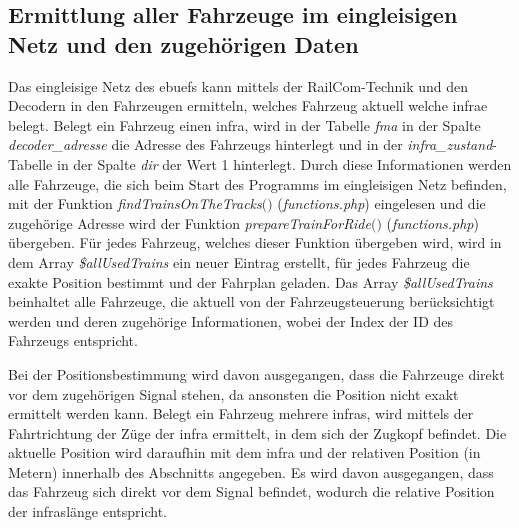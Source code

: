 \subsection{Ermittlung aller Fahrzeuge im eingleisigen Netz und den zugehörigen Daten} \label{main_2}
Das eingleisige Netz des \acp{ebuef} kann mittels der RailCom-Technik und den Decodern in den Fahrzeugen ermitteln, welches Fahrzeug aktuell welche \ac{infra}e belegt. Belegt ein Fahrzeug einen \ac{infra}, wird in der Tabelle \textit{fma} in der Spalte \textit{decoder\_adresse} die Adresse des Fahrzeugs hinterlegt und in der \textit{infra\_zustand}-Tabelle in der Spalte \textit{dir} der Wert 1 hinterlegt. Durch diese Informationen werden alle Fahrzeuge, die sich beim Start des Programms im eingleisigen Netz befinden, mit der Funktion \textit{find\-Trains\-On\-The\-Tracks$($$)$} (\textit{functions.php}) eingelesen und die zugehörige Adresse wird der Funktion \textit{prepare\-Train\-For\-Ride$($$)$} (\textit{functions.php}) übergeben. Für jedes Fahrzeug, welches dieser Funktion übergeben wird, wird in dem Array \textit{\$allUsedTrains} ein neuer Eintrag erstellt, für jedes Fahrzeug die exakte Position bestimmt und der Fahrplan geladen. Das Array \textit{\$all\-Used\-Trains} beinhaltet alle Fahrzeuge, die aktuell von der Fahrzeugsteuerung berücksichtigt werden und deren zugehörige Informationen, wobei der Index der ID des Fahrzeugs entspricht. 

Bei der Positionsbestimmung wird davon ausgegangen, dass die Fahrzeuge direkt vor dem zugehörigen Signal stehen, da ansonsten die Position nicht exakt ermittelt werden kann. Belegt ein Fahrzeug mehrere \acp{infra}, wird mittels der Fahrtrichtung der Züge der \ac{infra} ermittelt, in dem sich der Zugkopf befindet. Die aktuelle Position wird daraufhin mit dem \ac{infra} und der relativen Position (in Metern) innerhalb des Abschnitts angegeben. Es wird davon ausgegangen, dass das Fahrzeug sich direkt vor dem Signal befindet, wodurch die relative Position der \ac{infra}slänge entspricht.

